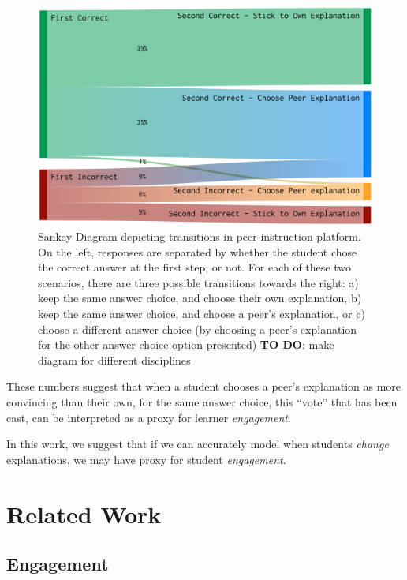 \documentclass[sigconf]{acmart}
\begin{document}
\begin{figure}
	\includegraphics[width=\linewidth]{img/transitions_final}
	\caption{
		Sankey Diagram depicting transitions in 
		peer-instruction 
		platform.
		On the left, responses are separated by 
		whether the student chose the 
		correct answer at the first step, or not.
		For each of these two scenarios, there are 
		three possible transitions 
		towards the right: a) keep the same answer 
		choice, and choose their own 
		explanation, b) keep the same answer 
		choice, and choose a peer's 
		explanation, or c) choose a different 
		answer choice (by choosing a 
		peer's explanation for the other answer 
		choice option 
		presented)
		\textbf{TO DO}: make diagram for different 
		disciplines
	}
	\label{fig:sankey}
\end{figure}

These numbers suggest that when a student chooses 
a peer's 
explanation as more 
convincing than their own, for the same answer 
choice, this 
``vote'' that has 
been cast, can be interpreted as a proxy for 
learner 
\textit{engagement}.

In this work, we suggest that if we can accurately 
model when 
students 
\textit{change} explanations, we may have proxy 
for student 
\textit{engagement}. 

\section{Related Work}

\subsection{Engagement}
\end{document}

